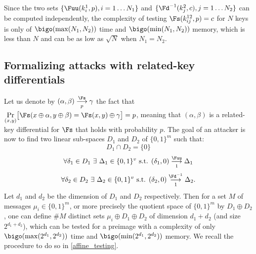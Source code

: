 Since the two sets $\{\Fuu(k^1_i, p), i = 1\ldots N_1\}$ and $\{\Fd^{-1}(k^2_j, c), j = 1\ldots N_2\}$ can be computed  independently, the complexity
of testing $\Fs(k^{12}_{ij},p) = c$ for
$N$ keys is only of $\bigo(\max(N_1, N_2))$ time and $\bigo(\min(N_1, N_2))$ memory, which is less than $N$
and can be as low as $\sqrt{N}$ when $N_1 = N_2$.

\subsection{Formalizing \mitm attacks with related-key differentials}

Let us denote by $(\alpha,  \beta) \overset{\Fs}{\underset{p}{\longrightarrow}} \gamma$ the fact that 
$\underset{(x,y)}{\Pr}\big[\Fs(x \oplus \alpha, y \oplus \beta) = \Fs(x, y) \oplus \gamma\big] = p$, meaning
that $(\alpha, \beta)$ is a related-key differential for $\Fs$ that holds with probability $p$.
The goal of an attacker is now to find two linear sub-spaces $D_1$ and $D_2$ of $\{0,1\}^m$ such that:
\begin{equation}
D_1 \cap D_2 = \{0\}
\end{equation}
\vspace{-4mm}
\begin{equation}
\forall \delta_1 \in D_1~\exists~ \Delta_1 \in \{0,1\}^v \text{ s.t. } (\delta_1, 0) \overset{\Fuu}{\underset{1}{\longrightarrow}} \Delta_1
\label{diff1}
\end{equation}
\vspace{-4mm}
\begin{equation}
\forall \delta_2 \in D_2~ \exists~ \Delta_2 \in \{0,1\}^v \text{ s.t. } (\delta_2, 0) \overset{\Fd^{-1}}{\underset{1}{\longrightarrow}} \Delta_2.
\label{diff2}
\end{equation}
Let $d_1$ and $d_2$ be the dimension of $D_1$ and $D_2$ respectively. Then for a set $M$ of messages $\mu_i \in \{0,1\}^m$, or more
precisely the quotient space of $\{0,1\}^m$ by $D_1 \oplus D_2$,
one can define $\#M$ distinct sets $\mu_i \oplus D_1 \oplus D_2$ of dimension $d_1 + d_2$ (and size $2^{d_1 + d_2}$),
which can be tested for a preimage with a complexity of only $\bigo(\max(2^{d_1}, 2^{d_2}))$ time and $\bigo(\min(2^{d_1}, 2^{d_2}))$ memory.
We recall the procedure to do so in \autoref{affine_testing}.
 
